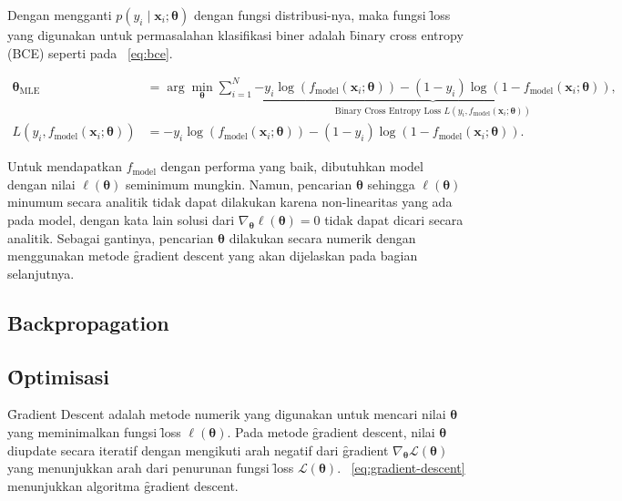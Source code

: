     Dengan mengganti $p(y_i \mid \mathbf{x}_i; \bm{\theta})$ dengan fungsi distribusi-nya, maka fungsi \f{loss} yang digunakan untuk permasalahan klasifikasi biner adalah \f{binary cross entropy} (BCE) seperti pada \equ~\ref{eq:bce}.

    \begin{align}
        \bm{\theta}_{\text{MLE}} &= \arg\min_{\bm{\theta}}\sum_{i=1}^{N}\underbrace{-y_i \log\left(f_{\text{model}}(\mathbf{x}_i; \bm{\theta})\right) - (1 - y_i) \log\left(1 - f_{\text{model}}(\mathbf{x}_i; \bm{\theta})\right)}_{\text{Binary Cross Entropy Loss } L(y_i, f_{\text{model}}(\mathbf{x}_i; \bm{\theta}))}, \\
        \label{eq:bce} 
        L(y_i, f_{\text{model}}(\mathbf{x}_i; \bm{\theta})) &= -y_i \log\left(f_{\text{model}}(\mathbf{x}_i; \bm{\theta})\right) - (1 - y_i) \log\left(1 - f_{\text{model}}(\mathbf{x}_i; \bm{\theta})\right).
    \end{align}

    Untuk mendapatkan $f_\text{model}$ dengan performa yang baik, dibutuhkan model dengan nilai $\ell(\bm{\theta})$ seminimum mungkin. Namun, pencarian $\bm{\theta}$ sehingga $ \ell (\bm{\theta})$ minumum secara analitik tidak dapat dilakukan karena non-linearitas yang ada pada model, dengan kata lain solusi dari $\nabla_{\bm{\theta}} \ell(\bm{\theta}) = 0$ tidak dapat dicari secara analitik. Sebagai gantinya, pencarian $\bm{\theta}$ dilakukan secara numerik dengan menggunakan metode \f{gradient descent} yang akan dijelaskan pada bagian selanjutnya.
    
    \subsection{\f{Backpropagation}}

    \subsection{\f{Optimisasi}}

    \f{Gradient Descent} adalah metode numerik yang digunakan untuk mencari nilai $\bm{\theta}$ yang meminimalkan fungsi \f{loss} $\ell(\bm{\theta})$. Pada metode \f{gradient descent}, nilai $\bm{\theta}$ diupdate secara iteratif dengan mengikuti arah negatif dari \f{gradient} $\nabla_{\bm{\theta}} \mathcal{L}(\bm{\theta})$ yang menunjukkan arah dari penurunan fungsi \f{loss} $\mathcal{L}(\bm{\theta})$. \equ~\ref{eq:gradient-descent} menunjukkan algoritma \f{gradient descent}.


